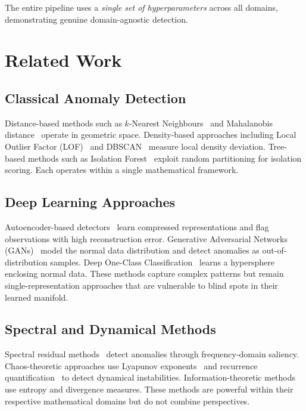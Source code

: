 \documentclass[journal]{IEEEtran}
\begin{document}
The entire pipeline uses a \textit{single set of hyperparameters} across all domains, demonstrating genuine domain-agnostic detection.

\section{Related Work}
\label{sec:related}

\subsection{Classical Anomaly Detection}

Distance-based methods such as $k$-Nearest Neighbours~\cite{ramaswamy2000efficient} and Mahalanobis distance~\cite{de2000mahalanobis} operate in geometric space. Density-based approaches including Local Outlier Factor (LOF)~\cite{breunig2000lof} and DBSCAN~\cite{ester1996density} measure local density deviation. Tree-based methods such as Isolation Forest~\cite{liu2008isolation} exploit random partitioning for isolation scoring. Each operates within a single mathematical framework.

\subsection{Deep Learning Approaches}

Autoencoder-based detectors~\cite{an2015variational,zhou2017anomaly} learn compressed representations and flag observations with high reconstruction error. Generative Adversarial Networks (GANs)~\cite{schlegl2017unsupervised} model the normal data distribution and detect anomalies as out-of-distribution samples. Deep One-Class Classification~\cite{ruff2018deep} learns a hypersphere enclosing normal data. These methods capture complex patterns but remain single-representation approaches that are vulnerable to blind spots in their learned manifold.

\subsection{Spectral and Dynamical Methods}

Spectral residual methods~\cite{ren2019time} detect anomalies through frequency-domain saliency. Chaos-theoretic approaches use Lyapunov exponents~\cite{rosenstein1993practical} and recurrence quantification~\cite{marwan2007recurrence} to detect dynamical instabilities. Information-theoretic methods~\cite{lee2001information} use entropy and divergence measures. These methods are powerful within their respective mathematical domains but do not combine perspectives.
\end{document}

